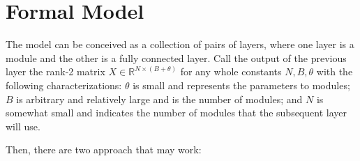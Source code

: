 \documentclass[12pt]{article}
\begin{document}
\section{Formal Model}\label{Formal Model}
\par The model can be conceived as a collection of pairs of layers, where one layer is a module and the other is a fully connected layer.  Call the output of the previous layer the rank-2 matrix $X \in \mathbb{R}^{N\times(B+\theta)}$ for any whole constants $N, B, \theta$ with the following characterizations:  $\theta$ is small and represents the parameters to modules; $B$ is arbitrary and relatively large and is the number of modules; and $N$ is somewhat small and indicates the number of modules that the subsequent layer will use. \par 
Then, there are two approach that may work:
\end{document}
